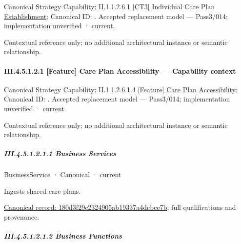 {\small Canonical Strategy Capability: II.1.1.2.6.1 \hyperref[element:03ea71cc13094c62ab6bbc6f51b1fffc]{[CT3] Individual Care Plan Establishment}; Canonical ID: \texttt{}. Accepted replacement model — Pass3/014; implementation unverified · current.}\par
Contextual reference only; no additional architectural instance or semantic relationship.\par
\paragraph*{III.4.5.1.2.1 [Feature] Care Plan Accessibility — Capability context}
\label{navigation:III.4.5.1.2.1}

{\small Canonical Strategy Capability: II.1.1.2.6.1.4 \hyperref[element:ca741f8bbfd246cc9a39ec117b24fa0c]{[Feature] Care Plan Accessibility}; Canonical ID: \texttt{}. Accepted replacement model — Pass3/014; implementation unverified · current.}\par
Contextual reference only; no additional architectural instance or semantic relationship.\par
\subparagraph*{III.4.5.1.2.1.1 Business Services}
\label{navigation:III.4.5.1.2.1.1}

\label{navigation:III.4.5.1.2.1.1.1}

\label{element:180d3f29c2324905ab19337a4dcbce7b}
{\small BusinessService · Canonical · current}\par

Ingests shared care plans.


{\footnotesize \href{../../../../continuum/business/business-service/180d3f29c2324905ab19337a4dcbce7b.md}{Canonical record: 180d3f29c2324905ab19337a4dcbce7b}; full qualifications and provenance.}\par
\subparagraph*{III.4.5.1.2.1.2 Business Functions}
\label{navigation:III.4.5.1.2.1.2}

\label{navigation:III.4.5.1.2.1.2.1}


